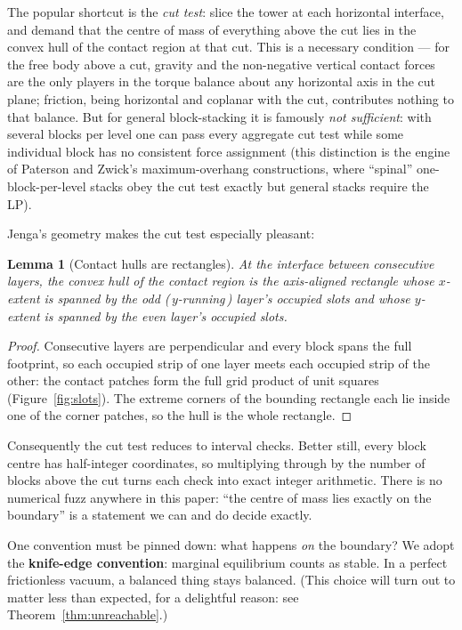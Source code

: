 \documentclass[11pt]{article}
\newtheorem{lemma}[theorem]{Lemma}
\theoremstyle{definition}
\theoremstyle{remark}
\begin{document}
The popular shortcut is the \emph{cut test}: slice the tower at each
horizontal interface, and demand that the centre of mass of everything
above the cut lies in the convex hull of the contact region at that cut.
This is a necessary condition --- for the free body above a cut, gravity and
the non-negative vertical contact forces are the only players in the torque
balance about any horizontal axis in the cut plane; friction, being
horizontal and coplanar with the cut, contributes nothing to that balance.
But for general block-stacking it is famously \emph{not sufficient}: with
several blocks per level one can pass every aggregate cut test while some
individual block has no consistent force assignment (this distinction is
the engine of Paterson and Zwick's maximum-overhang constructions, where
``spinal'' one-block-per-level stacks obey the cut test exactly but general
stacks require the LP).

Jenga's geometry makes the cut test especially pleasant:

\begin{lemma}[Contact hulls are rectangles]\label{lem:rect}
At the interface between consecutive layers, the convex hull of the contact
region is the axis-aligned rectangle whose $x$-extent is spanned by the
odd (\,$y$-running\,) layer's occupied slots and whose $y$-extent is spanned
by the even layer's occupied slots.
\end{lemma}

\begin{proof}
Consecutive layers are perpendicular and every block spans the full
footprint, so each occupied strip of one layer meets each occupied strip of
the other: the contact patches form the full grid product of unit squares
(Figure~\ref{fig:slots}). The extreme corners of the bounding rectangle each
lie inside one of the corner patches, so the hull is the whole rectangle.
\end{proof}

Consequently the cut test reduces to interval checks. Better still, every
block centre has half-integer coordinates, so multiplying through by the
number of blocks above the cut turns each check into exact integer
arithmetic. There is no numerical fuzz anywhere in this paper: ``the centre
of mass lies exactly on the boundary'' is a statement we can and do decide
exactly.

One convention must be pinned down: what happens \emph{on} the boundary? We
adopt the \textbf{knife-edge convention}: marginal equilibrium counts as
stable. In a perfect frictionless vacuum, a balanced thing stays balanced.
(This choice will turn out to matter less than expected, for a delightful
reason: see Theorem~\ref{thm:unreachable}.)
\end{document}

